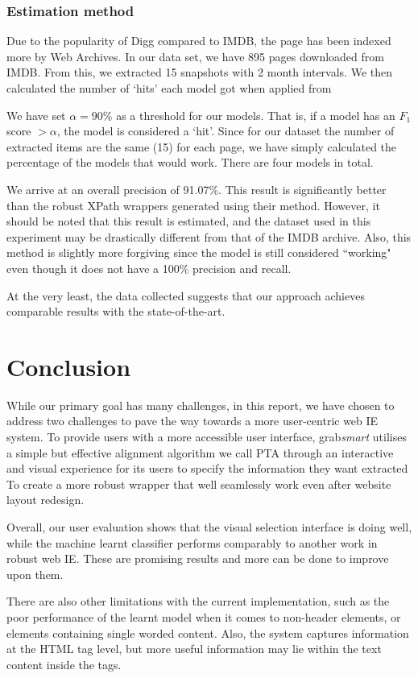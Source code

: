 \documentclass[a4paper,12pt]{nurop}
\begin{document}
\subsubsection{Estimation method}
Due to the popularity of Digg compared to IMDB, the page has been indexed more by Web Archives.
In our data set, we have 895 pages downloaded from IMDB. From this, we extracted 15 snapshots
with 2 month intervals. We then calculated the number of `hits' each model got when applied from


We have set $\alpha = 90\%$ as a threshold for our models. That is, if a model has an $F_1$
score $> \alpha$, the model is considered a `hit'.
Since for our dataset the number of extracted items are the same (15) for each page,
we have simply calculated the percentage of the models that would work. There are four
models in total.


We arrive at an overall precision of 91.07\%. This result is significantly better than the robust
XPath wrappers generated using their method. However,
it should be noted that this result is estimated, and the dataset used in this experiment may
be drastically different from that of the IMDB archive. Also, this method is slightly more forgiving
since the model is still considered ``working" even though it does not have a 100\% precision
and recall.

	At the very least, the data collected suggests that our approach achieves comparable
results with the state-of-the-art.
\section{Conclusion}
While our primary goal has many challenges, in this report, we have chosen to address 
two challenges to pave the way towards a more user-centric web IE system. To provide users with a more accessible
user interface, grab\textit{smart} utilises a simple but effective alignment algorithm we call
PTA through an interactive and visual experience for its users to specify the information they want extracted
To create a more robust wrapper that well seamlessly work even after website layout redesign.

Overall, our user evaluation shows that the visual selection interface is doing well, 
while the machine learnt classifier performs comparably to another work in robust 
web IE. These are promising results and more can be done to improve upon them.

There are also other limitations with the current implementation, such as the poor performance of
the learnt model when it comes to non-header elements, or elements containing single worded
content. Also, the system captures information at the HTML tag level, but more useful information
may lie within the text content inside the tags.
\end{document}
